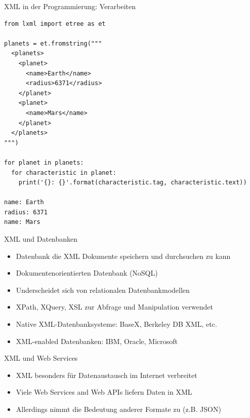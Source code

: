 \documentclass{beamer}
\begin{document}
\begin{frame}[fragile]{XML in der Programmierung: Verarbeiten}

	\lstset{language=Python}
	\scriptsize
	\begin{lstlisting}
from lxml import etree as et

planets = et.fromstring("""
  <planets>
    <planet>
      <name>Earth</name>
      <radius>6371</radius>
    </planet>
    <planet>
      <name>Mars</name>
    </planet>
  </planets>
""")

for planet in planets:
  for characteristic in planet:
    print('{}: {}'.format(characteristic.tag, characteristic.text))
    
name: Earth
radius: 6371
name: Mars
	\end{lstlisting}
	
\end{frame}

\begin{frame}{XML und Datenbanken}
	
	\begin{itemize}
		\item Datenbank die XML Dokumente speichern und durchsuchen zu kann
		\item Dokumentenorientierten Datenbank (NoSQL)
		\item Underscheidet sich von relationalen Datenbankmodellen
		\item XPath, XQuery, XSL zur Abfrage und Manipulation verwendet
		\item Native XML-Datenbanksysteme: BaseX, Berkeley DB XML, etc.
		\item XML-enabled Datenbanken: IBM, Oracle, Microsoft
	\end{itemize}
	
\end{frame}

\begin{frame}{XML und Web Services}
	
	\begin{itemize}
		\item XML besonders für Datenaustausch im Internet verbreitet
		\item Viele Web Services and Web APIs liefern Daten in XML
		\item Allerdings nimmt die Bedeutung anderer Formate zu (z.B. JSON)
	\end{itemize}
	
\end{frame}
\end{document}
